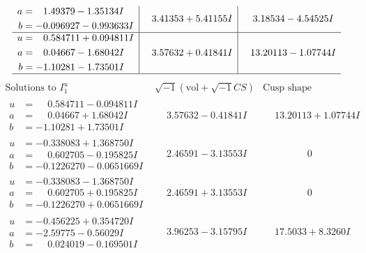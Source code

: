 \documentclass[1p]{elsarticle_modified}
\theoremstyle{definition}
\newcommand{\I}{\sqrt{-1}}
\begin{document}
$$\begin{array}{c|c|c}
\begin{aligned}
a &= \phantom{-}1.49379 - 1.35134 I \\
b &= -0.096927 - 0.993633 I\end{aligned}
 & \phantom{-}3.41353 + 5.41155 I & \phantom{-}3.18534 - 4.54525 I \\ \hline\begin{aligned}
u &= \phantom{-}0.584711 + 0.094811 I \\
a &= \phantom{-}0.04667 - 1.68042 I \\
b &= -1.10281 - 1.73501 I\end{aligned}
 & \phantom{-}3.57632 + 0.41841 I & \phantom{-}13.20113 - 1.07744 I\\
 \hline 
 \end{array}$$\newpage$$\begin{array}{c|c|c}  
\text{Solutions to }I^u_{1}& \I (\text{vol} + \sqrt{-1}CS) & \text{Cusp shape}\\
 \hline 
\begin{aligned}
u &= \phantom{-}0.584711 - 0.094811 I \\
a &= \phantom{-}0.04667 + 1.68042 I \\
b &= -1.10281 + 1.73501 I\end{aligned}
 & \phantom{-}3.57632 - 0.41841 I & \phantom{-}13.20113 + 1.07744 I \\ \hline\begin{aligned}
u &= -0.338083 + 1.368750 I \\
a &= \phantom{-}0.602705 - 0.195825 I \\
b &= -0.1226270 - 0.0651669 I\end{aligned}
 & \phantom{-}2.46591 - 3.13553 I & \phantom{-0.000000 } 0 \\ \hline\begin{aligned}
u &= -0.338083 - 1.368750 I \\
a &= \phantom{-}0.602705 + 0.195825 I \\
b &= -0.1226270 + 0.0651669 I\end{aligned}
 & \phantom{-}2.46591 + 3.13553 I & \phantom{-0.000000 } 0 \\ \hline\begin{aligned}
u &= -0.456225 + 0.354720 I \\
a &= -2.59775 - 0.56029 I \\
b &= \phantom{-}0.024019 - 0.169501 I\end{aligned}
 & \phantom{-}3.96253 - 3.15795 I & \phantom{-}17.5033 + 8.3260 I \\ \hline\begin{aligned}

\end{aligned}
\end{array}$$
\end{document}
